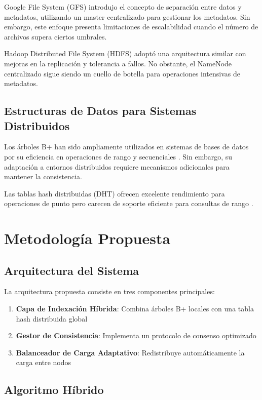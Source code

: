 \documentclass[conference]{IEEEtran}
\begin{document}
Google File System (GFS) \cite{ghemawat2003google} introdujo el concepto de separación entre datos y metadatos, utilizando un master centralizado para gestionar los metadatos. Sin embargo, este enfoque presenta limitaciones de escalabilidad cuando el número de archivos supera ciertos umbrales.

Hadoop Distributed File System (HDFS) \cite{shvachko2010hadoop} adoptó una arquitectura similar con mejoras en la replicación y tolerancia a fallos. No obstante, el NameNode centralizado sigue siendo un cuello de botella para operaciones intensivas de metadatos.

\subsection{Estructuras de Datos para Sistemas Distribuidos}

Los árboles B+ han sido ampliamente utilizados en sistemas de bases de datos por su eficiencia en operaciones de rango y secuenciales \cite{comer1979ubiquitous}. Sin embargo, su adaptación a entornos distribuidos requiere mecanismos adicionales para mantener la consistencia.

Las tablas hash distribuidas (DHT) ofrecen excelente rendimiento para operaciones de punto pero carecen de soporte eficiente para consultas de rango \cite{stoica2001chord}.

\section{Metodología Propuesta}

\subsection{Arquitectura del Sistema}

La arquitectura propuesta consiste en tres componentes principales:

\begin{enumerate}
\item \textbf{Capa de Indexación Híbrida}: Combina árboles B+ locales con una tabla hash distribuida global
\item \textbf{Gestor de Consistencia}: Implementa un protocolo de consenso optimizado
\item \textbf{Balanceador de Carga Adaptativo}: Redistribuye automáticamente la carga entre nodos
\end{enumerate}

\subsection{Algoritmo Híbrido}
\end{document}
